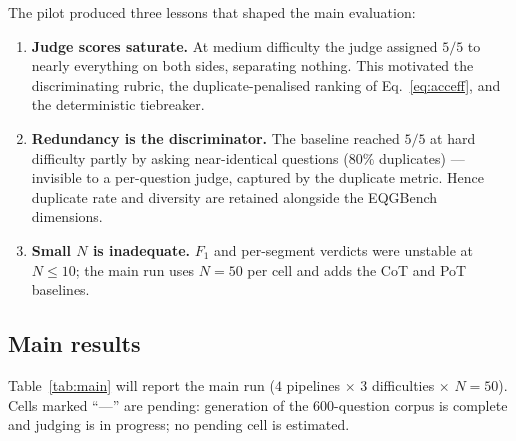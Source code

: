 The pilot produced three lessons that shaped the main evaluation:
\begin{enumerate}
  \item \textbf{Judge scores saturate.} At medium difficulty the judge
        assigned $5/5$ to nearly everything on both sides, separating nothing.
        This motivated the discriminating rubric, the duplicate-penalised
        ranking of Eq.~\eqref{eq:acceff}, and the deterministic tiebreaker.
  \item \textbf{Redundancy is the discriminator.} The baseline reached $5/5$
        at hard difficulty partly by asking near-identical questions
        ($80\%$ duplicates) --- invisible to a per-question judge, captured by
        the duplicate metric. Hence duplicate rate and diversity are retained
        alongside the EQGBench dimensions.
  \item \textbf{Small $N$ is inadequate.} $F_1$ and per-segment verdicts were
        unstable at $N\le 10$; the main run uses $N{=}50$ per cell and adds
        the CoT and PoT baselines.
\end{enumerate}

\subsection{Main results}
\label{sec:eval-results}

Table~\ref{tab:main} will report the main run
($4$ pipelines $\times$ $3$ difficulties $\times$ $N{=}50$). Cells marked
``---'' are pending: generation of the $600$-question corpus is complete and
judging is in progress; no pending cell is estimated.


